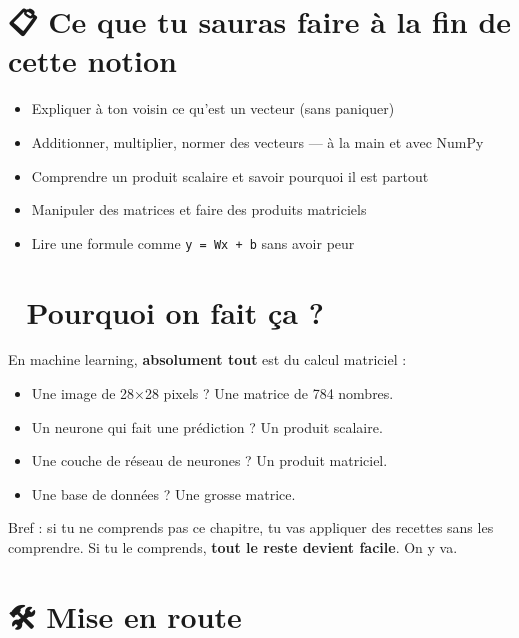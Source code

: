 \documentclass[
  french,
  11pt,
  a4paper,
]{scrbook}
\providecommand{\tightlist}{%
  \setlength{\itemsep}{0pt}\setlength{\parskip}{0pt}}
\begin{document}
\section{📋 Ce que tu sauras faire à la fin de cette
notion}\label{ce-que-tu-sauras-faire-uxe0-la-fin-de-cette-notion}

\begin{itemize}
\tightlist
\item
  Expliquer à ton voisin ce qu'est un vecteur (sans paniquer)
\item
  Additionner, multiplier, normer des vecteurs --- à la main et avec
  NumPy
\item
  Comprendre un produit scalaire et savoir pourquoi il est partout
\item
  Manipuler des matrices et faire des produits matriciels
\item
  Lire une formule comme \texttt{y\ =\ Wx\ +\ b} sans avoir peur
\end{itemize}

\section{🎯 Pourquoi on fait ça ?}\label{pourquoi-on-fait-uxe7a}

En machine learning, \textbf{absolument tout} est du calcul matriciel :

\begin{itemize}
\tightlist
\item
  Une image de 28×28 pixels ? Une matrice de 784 nombres.
\item
  Un neurone qui fait une prédiction ? Un produit scalaire.
\item
  Une couche de réseau de neurones ? Un produit matriciel.
\item
  Une base de données ? Une grosse matrice.
\end{itemize}

Bref : si tu ne comprends pas ce chapitre, tu vas appliquer des recettes
sans les comprendre. Si tu le comprends, \textbf{tout le reste devient
facile}. On y va.

\section{🛠️ Mise en route}\label{mise-en-route}
\end{document}
